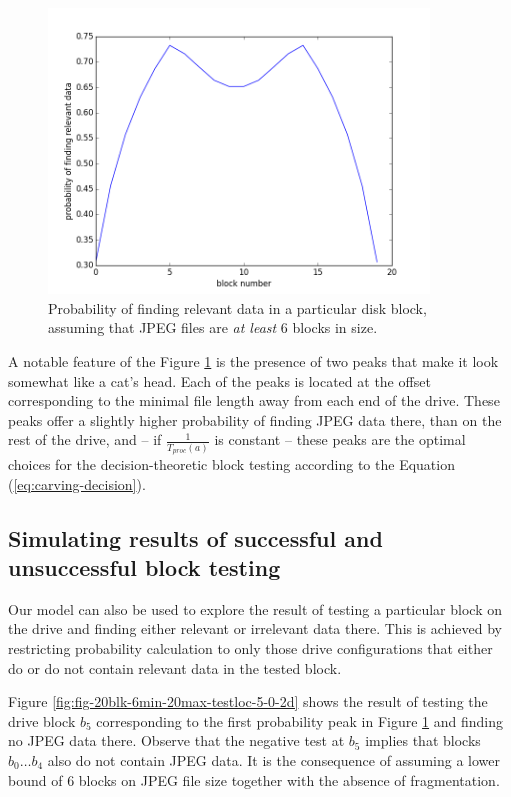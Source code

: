 \documentclass[final,5p,times,twocolumn,authoryear]{elsarticle}
\begin{document}
\begin{figure}
  \centerline{\includegraphics[width=0.9\textwidth]{figures/fig-20blk-6min-20max2d}}
  \caption{Probability of finding relevant data in a particular disk block, assuming that JPEG files are \emph{at least} 6 blocks in size.}
  \label{fig:fig-20blk-6min-20max2d}
\end{figure}

A notable feature of the Figure \ref{fig:fig-20blk-6min-20max2d} is the presence of two peaks that make it look somewhat like a cat's head. Each of the peaks is located at the offset corresponding to the minimal file length away from each end of the drive. These peaks offer a slightly higher probability of finding JPEG data there, than on the rest of the drive, and -- if $\frac{1}{T_{proc}(a)}$ is constant -- these peaks are the optimal choices for the decision-theoretic block testing according to the Equation (\ref{eq:carving-decision}).

\subsection{Simulating results of successful and unsuccessful block testing}

Our model can also be used to explore the result of testing a particular block on the drive and finding either relevant or irrelevant data there. This is achieved by restricting probability calculation to only those drive configurations that either do or do not contain relevant data in the tested block. 

Figure \ref{fig:fig-20blk-6min-20max-testloc-5-0-2d} shows the result of testing the drive block $b_5$ corresponding to the first probability peak in Figure \ref{fig:fig-20blk-6min-20max2d} and finding no JPEG data there. Observe that the negative test at $b_5$ implies that blocks $b_0 \dots b_4$ also do not contain JPEG data. It is the consequence of assuming a lower bound of 6 blocks on JPEG file size together with the absence of fragmentation. 
\end{document}
